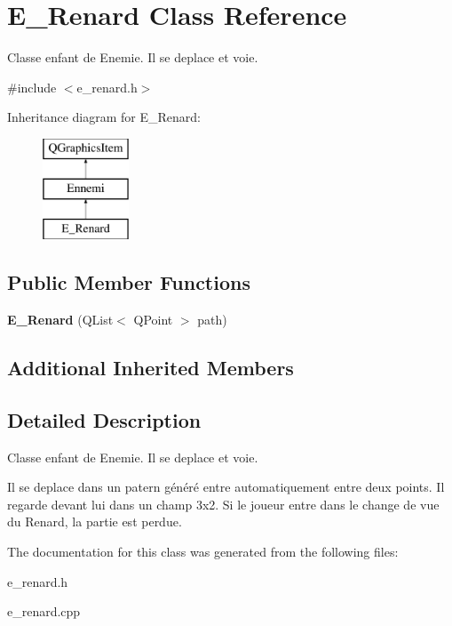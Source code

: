 \hypertarget{class_e___renard}{}\section{E\+\_\+\+Renard Class Reference}
\label{class_e___renard}


Classe enfant de Enemie. Il se deplace et voie.  




{\ttfamily \#include $<$e\+\_\+renard.\+h$>$}

Inheritance diagram for E\+\_\+\+Renard\+:\begin{figure}[H]
\begin{center}
\leavevmode
\includegraphics[height=3.000000cm]{class_e___renard}
\end{center}
\end{figure}
\subsection*{Public Member Functions}
\begin{DoxyCompactItemize}
\item 
\hypertarget{class_e___renard_a1cd896de8a46532ab855854b3366e426}{}{\bfseries E\+\_\+\+Renard} (Q\+List$<$ Q\+Point $>$ path)\label{class_e___renard_a1cd896de8a46532ab855854b3366e426}

\end{DoxyCompactItemize}
\subsection*{Additional Inherited Members}


\subsection{Detailed Description}
Classe enfant de Enemie. Il se deplace et voie. 

Il se deplace dans un patern généré entre automatiquement entre deux points. Il regarde devant lui dans un champ 3x2. Si le joueur entre dans le change de vue du Renard, la partie est perdue. 

The documentation for this class was generated from the following files\+:\begin{DoxyCompactItemize}
\item 
e\+\_\+renard.\+h\item 
e\+\_\+renard.\+cpp\end{DoxyCompactItemize}
